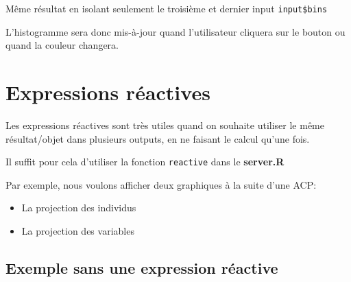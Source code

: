 \documentclass[
]{article}
\newenvironment{Shaded}{\begin{snugshade}}{\end{snugshade}}
\newcommand{\AttributeTok}[1]{\textcolor[rgb]{0.77,0.63,0.00}{#1}}
\newcommand{\DecValTok}[1]{\textcolor[rgb]{0.00,0.00,0.81}{#1}}
\newcommand{\FunctionTok}[1]{\textcolor[rgb]{0.00,0.00,0.00}{#1}}
\newcommand{\NormalTok}[1]{#1}
\newcommand{\OtherTok}[1]{\textcolor[rgb]{0.56,0.35,0.01}{#1}}
\newcommand{\SpecialCharTok}[1]{\textcolor[rgb]{0.00,0.00,0.00}{#1}}
\newcommand{\StringTok}[1]{\textcolor[rgb]{0.31,0.60,0.02}{#1}}
\providecommand{\tightlist}{%
  \setlength{\itemsep}{0pt}\setlength{\parskip}{0pt}}
\begin{document}
Même résultat en isolant seulement le troisième et dernier input
\texttt{input\$bins}

\begin{Shaded}
\end{Shaded}

L'histogramme sera donc mis-à-jour quand l'utilisateur cliquera sur le
bouton ou quand la couleur changera.

\hypertarget{expressions-ruxe9actives}{%
\section{Expressions réactives}\label{expressions-ruxe9actives}}

Les expressions réactives sont très utiles quand on souhaite utiliser le
même résultat/objet dans plusieurs outputs, en ne faisant le calcul
qu'une fois.

Il suffit pour cela d'utiliser la fonction \texttt{reactive} dans le
\textbf{server.R}

Par exemple, nous voulons afficher deux graphiques à la suite d'une ACP:

\begin{itemize}
\tightlist
\item
  La projection des individus
\item
  La projection des variables
\end{itemize}

\hypertarget{exemple-sans-une-expression-ruxe9active}{%
\subsection{Exemple sans une expression
réactive}\label{exemple-sans-une-expression-ruxe9active}}
\end{document}
